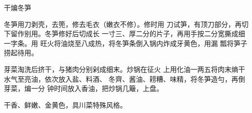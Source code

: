 \begin{recipe}{干煸冬笋}

\ingredients


\cooking

\step 冬笋用刀剥壳，去篼，修去毛衣（嫩衣不修）。修时用 刀试笋，有顶刀部分，再切下留作别用。冬笋修好后切成长 一寸三、厚二分的片子，再用手按二分宽撕成细一字条。用 旺火将油烧至八成热，将冬笋条倒入锅内炸成牙黄色，用漏 瓢将笋子捞起待用。

\step 芽菜淘洗后挤干，与猪肉分别剁成细末。炒锅在征火 上用化油一两五将肉末熵干水气至亮油，依次放入盐、料酒、 冬齊、酱油、耢糟、味精，将冬笋造勻，再倒芽菜，煸一分 钟时间放入香油，把炒锅几簸，上盘。

\notes

干香、鲜嫩、金黄色，具川菜特殊风格。

\end{recipe}

